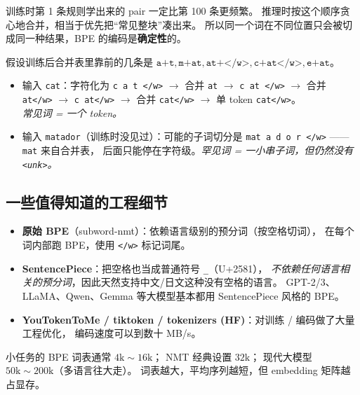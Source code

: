 \begin{intuitionblock}
训练时第 1 条规则学出来的 pair 一定比第 100 条更频繁。
推理时按这个顺序贪心地合并，相当于优先把“常见整块”凑出来。
所以同一个词在不同位置只会被切成同一种结果，BPE 的编码是\textbf{确定性}的。
\end{intuitionblock}

\begin{example}
假设训练后合并表里靠前的几条是
$\texttt{a+t}, \texttt{m+at}, \texttt{at+</w>}, \texttt{c+at</w>}, \texttt{e+at}$。
\begin{itemize}
    \item 输入 \texttt{cat}：字符化为 \texttt{c\,a\,t\,</w>}
          $\to$ 合并 \texttt{at} $\to$ \texttt{c\,at\,</w>}
          $\to$ 合并 \texttt{at</w>} $\to$ \texttt{c\,at</w>}
          $\to$ 合并 \texttt{cat</w>} $\to$ 单 token \texttt{cat</w>}。\\
          \emph{常见词 = 一个 token。}
    \item 输入 \texttt{matador}（训练时没见过）：可能的子词切分是
          \texttt{mat\,a\,d\,o\,r\,</w>} —— \texttt{mat} 来自合并表，
          后面只能停在字符级。\emph{罕见词 = 一小串子词，但仍然没有 \texttt{<unk>}。}
\end{itemize}
\end{example}

\subsection{一些值得知道的工程细节}

\begin{engbox}[实现家族]
\begin{itemize}
    \item \textbf{原始 BPE}（subword-nmt）：依赖语言级别的预分词（按空格切词），
          在每个词内部跑 BPE，使用 \texttt{</w>} 标记词尾。
    \item \textbf{SentencePiece}：把空格也当成普通符号 \texttt{\_}（U+2581），
          \emph{不依赖任何语言相关的预分词}，因此天然支持中文/日文这种没有空格的语言。
          GPT-2/3、LLaMA、Qwen、Gemma 等大模型基本都用 SentencePiece 风格的 BPE。
    \item \textbf{YouTokenToMe / tiktoken / tokenizers (HF)}：对训练 / 编码做了大量工程优化，
          编码速度可以到数十 MB/s。
\end{itemize}
\end{engbox}

\begin{remark}[词表大小的经验值]
小任务的 BPE 词表通常 $4\text{k}\!\sim\!16\text{k}$；
NMT 经典设置 $32\text{k}$；
现代大模型 $50\text{k}\!\sim\!200\text{k}$（多语言往大走）。
词表越大，平均序列越短，但 embedding 矩阵越占显存。
\end{remark}

